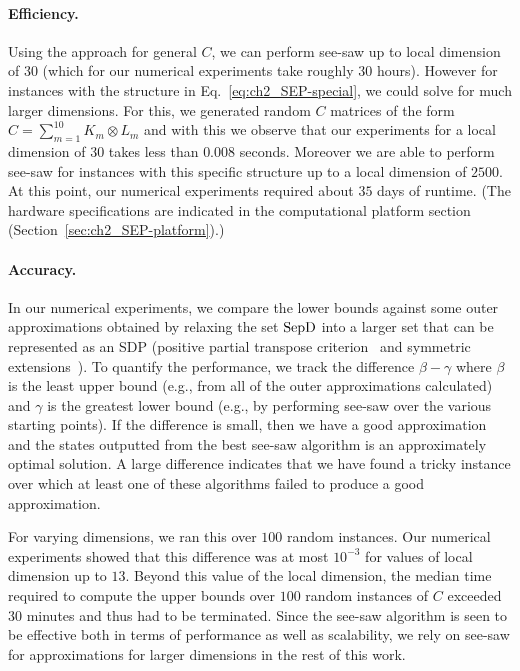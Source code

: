 \paragraph{Efficiency.}  
Using the approach for general $C$, we can perform see-saw up to local dimension of $30$ (which for our numerical experiments take roughly $30$ hours). 
However for instances with the structure in Eq.~\eqref{eq:ch2_SEP-special}, we could solve for much larger dimensions. 
For this, we generated random $C$ matrices of the form $C = \sum_{m=1}^{10} K_m \otimes L_m$ and with this we observe that our experiments for a local dimension of $30$ takes less than $0.008$ seconds.
Moreover we are able to perform see-saw for instances with this specific structure up to a local dimension of $2500$.
At this point, our numerical experiments required about $35$ days of runtime.
(The hardware specifications are indicated in the computational platform section (Section~\ref{sec:ch2_SEP-platform}).)  

\paragraph{Accuracy.}  
In our numerical experiments, we compare the lower bounds against some outer approximations obtained by relaxing the set $\mathrm{SepD}$ into a larger set that can be represented as an SDP (positive partial transpose criterion~\cite{peres1996separability, horodecki1996necessary} and symmetric extensions~\cite{doherty2002SymExt}).
To quantify the performance, we track the difference $\beta - \gamma$ where $\beta$ is the least upper bound (e.g., from all of the outer approximations calculated) and $\gamma$ is the greatest lower bound (e.g., by performing see-saw over the various starting points). 
If the difference is small, then we have a good approximation and the states outputted from the best see-saw algorithm is an approximately optimal solution. 
A large difference indicates that we have found a tricky instance over which at least one of these algorithms failed to produce a good approximation. 
  
For varying dimensions, we ran this over $100$ random instances.
Our numerical experiments showed that this difference was at most $10^{-3}$ for values of local dimension up to $13$.
Beyond this value of the local dimension, the median time required to compute the upper bounds over $100$ random instances of $C$ exceeded $30$ minutes and thus had to be terminated.
Since the see-saw algorithm is seen to be effective both in terms of performance as well as scalability, we rely on see-saw for approximations for larger dimensions in the rest of this work. 

